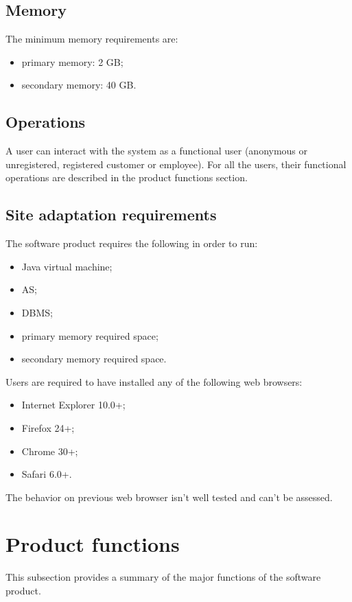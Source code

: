 \documentclass[a4paper,12pt]{book}
\begin{document}
\subsection{Memory}
The minimum memory requirements are:
\begin{itemize}[noitemsep]
  \item primary memory: 2 GB;
  \item secondary memory: 40 GB.
\end{itemize}

\subsection{Operations}
A user can interact with the system as a functional user (anonymous or unregistered, registered customer or employee). For all the users, their functional operations are described in the product functions section.

\subsection{Site adaptation requirements}
The software product requires the following in order to run:
\begin{itemize}[noitemsep]
  \item Java virtual machine;
  \item AS;
  \item DBMS;
  \item primary memory required space;
  \item secondary memory required space.
\end{itemize}

Users are required to have installed any of the following web browsers:
\begin{itemize}[noitemsep]
  \item Internet Explorer 10.0+;
  \item Firefox 24+;
  \item Chrome 30+;
  \item Safari 6.0+.
\end{itemize}
The behavior on previous web browser isn't well tested and can't be assessed.

\section{Product functions}
This subsection provides a summary of the major functions of the software product.
\end{document}
